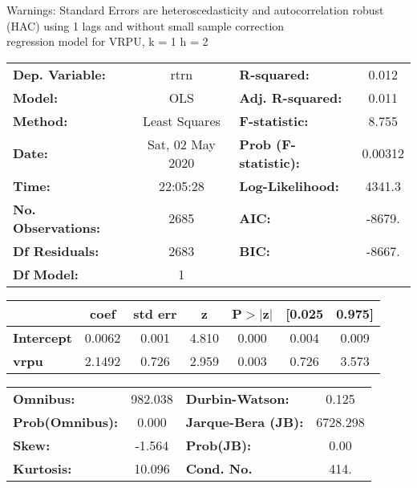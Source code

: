 Warnings: \newline
 [1] Standard Errors are heteroscedasticity and autocorrelation robust (HAC) using 1 lags and without small sample correction\\ 

regression model for VRPU, k = 1 h = 2\begin{center}
\begin{tabular}{lclc}
\toprule
\textbf{Dep. Variable:}    &       rtrn       & \textbf{  R-squared:         } &     0.012   \\
\textbf{Model:}            &       OLS        & \textbf{  Adj. R-squared:    } &     0.011   \\
\textbf{Method:}           &  Least Squares   & \textbf{  F-statistic:       } &     8.755   \\
\textbf{Date:}             & Sat, 02 May 2020 & \textbf{  Prob (F-statistic):} &  0.00312    \\
\textbf{Time:}             &     22:05:28     & \textbf{  Log-Likelihood:    } &    4341.3   \\
\textbf{No. Observations:} &        2685      & \textbf{  AIC:               } &    -8679.   \\
\textbf{Df Residuals:}     &        2683      & \textbf{  BIC:               } &    -8667.   \\
\textbf{Df Model:}         &           1      & \textbf{                     } &             \\
\bottomrule
\end{tabular}
\begin{tabular}{lcccccc}
                   & \textbf{coef} & \textbf{std err} & \textbf{z} & \textbf{P$> |$z$|$} & \textbf{[0.025} & \textbf{0.975]}  \\
\midrule
\textbf{Intercept} &       0.0062  &        0.001     &     4.810  &         0.000        &        0.004    &        0.009     \\
\textbf{vrpu}      &       2.1492  &        0.726     &     2.959  &         0.003        &        0.726    &        3.573     \\
\bottomrule
\end{tabular}
\begin{tabular}{lclc}
\textbf{Omnibus:}       & 982.038 & \textbf{  Durbin-Watson:     } &    0.125  \\
\textbf{Prob(Omnibus):} &   0.000 & \textbf{  Jarque-Bera (JB):  } & 6728.298  \\
\textbf{Skew:}          &  -1.564 & \textbf{  Prob(JB):          } &     0.00  \\
\textbf{Kurtosis:}      &  10.096 & \textbf{  Cond. No.          } &     414.  \\
\bottomrule
\end{tabular}
\end{center}

